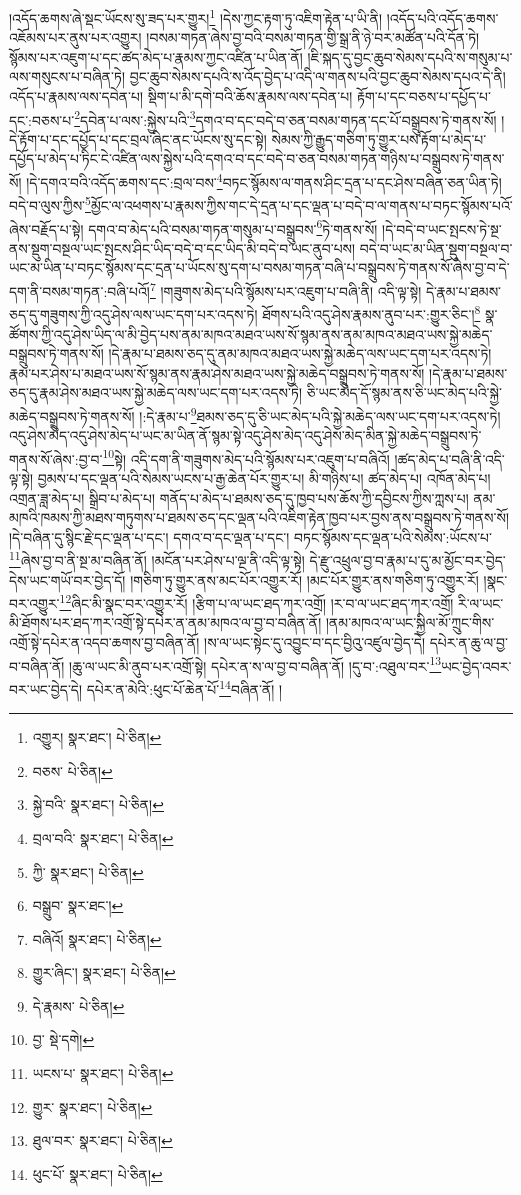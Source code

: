 །འདོད་ཆགས་ཞེ་སྡང་ཡོངས་སུ་ཟད་པར་གྱུར།\footnote{འགྱུར།  སྣར་ཐང་།  པེ་ཅིན། } །དེས་ཀྱང་རྟག་ཏུ་འཇིག་རྟེན་པ་ཡི་ནི། །འདོད་པའི་འདོད་ཆགས་འཇོམས་པར་ནུས་པར་འགྱུར། །བསམ་གཏན་ཞེས་བྱ་བའི་བསམ་གཏན་གྱི་སྒྲ་ནི་ཉེ་བར་མཚོན་པའི་དོན་ཏེ། སྙོམས་པར་འཇུག་པ་དང་ཚད་མེད་པ་རྣམས་ཀྱང་འཛིན་པ་ཡིན་ནོ། །ཇི་སྐད་དུ་བྱང་ཆུབ་སེམས་དཔའི་ས་གསུམ་པ་ལས་གསུངས་པ་བཞིན་ཏེ། བྱང་ཆུབ་སེམས་དཔའི་ས་འོད་བྱེད་པ་འདི་ལ་གནས་པའི་བྱང་ཆུབ་སེམས་དཔའ་དེ་ནི། འདོད་པ་རྣམས་ལས་དབེན་པ། སྡིག་པ་མི་དགེ་བའི་ཆོས་རྣམས་ལས་དབེན་པ། རྟོག་པ་དང་བཅས་པ་དཔྱོད་པ་དང་:བཅས་པ་\footnote{བཅས་  པེ་ཅིན། }དབེན་པ་ལས་:སྐྱེས་པའི་\footnote{སྐྱེ་བའི་  སྣར་ཐང་།  པེ་ཅིན། }དགའ་བ་དང་བདེ་བ་ཅན་བསམ་གཏན་དང་པོ་བསྒྲུབས་ཏེ་གནས་སོ། །དེ་རྟོག་པ་དང་དཔྱོད་པ་དང་བྲལ་ཞིང་ནང་ཡོངས་སུ་དང་སྟེ། སེམས་ཀྱི་རྒྱུད་གཅིག་ཏུ་གྱུར་པས་རྟོག་པ་མེད་པ་དཔྱོད་པ་མེད་པ་ཏིང་ངེ་འཛིན་ལས་སྐྱེས་པའི་དགའ་བ་དང་བདེ་བ་ཅན་བསམ་གཏན་གཉིས་པ་བསྒྲུབས་ཏེ་གནས་སོ། །དེ་དགའ་བའི་འདོད་ཆགས་དང་:བྲལ་བས་\footnote{བྲལ་བའི་  སྣར་ཐང་།  པེ་ཅིན། }བཏང་སྙོམས་ལ་གནས་ཤིང་དྲན་པ་དང་ཤེས་བཞིན་ཅན་ཡིན་ཏེ། བདེ་བ་ལུས་ཀྱིས་\footnote{ཀྱི་  སྣར་ཐང་།  པེ་ཅིན། }མྱོང་ལ་འཕགས་པ་རྣམས་ཀྱིས་གང་དེ་དྲན་པ་དང་ལྡན་པ་བདེ་བ་ལ་གནས་པ་བཏང་སྙོམས་པའོ་ཞེས་བརྗོད་པ་སྟེ། དགའ་བ་མེད་པའི་བསམ་གཏན་གསུམ་པ་བསྒྲུབས་\footnote{བསྒྲུབ་  སྣར་ཐང་། }ཏེ་གནས་སོ། །དེ་བདེ་བ་ཡང་སྤངས་ཏེ་སྔ་ནས་སྡུག་བསྔལ་ཡང་སྤངས་ཤིང་ཡིད་བདེ་བ་དང་ཡིད་མི་བདེ་བ་ཡང་ནུབ་པས། བདེ་བ་ཡང་མ་ཡིན་སྡུག་བསྔལ་བ་ཡང་མ་ཡིན་པ་བཏང་སྙོམས་དང་དྲན་པ་ཡོངས་སུ་དག་པ་བསམ་གཏན་བཞི་པ་བསྒྲུབས་ཏེ་གནས་སོ་ཞེས་བྱ་བ་དེ་དག་ནི་བསམ་གཏན་:བཞི་པའོ།\footnote{བཞིའོ།  སྣར་ཐང་།  པེ་ཅིན། } །གཟུགས་མེད་པའི་སྙོམས་པར་འཇུག་པ་བཞི་ནི། འདི་ལྟ་སྟེ། དེ་རྣམ་པ་ཐམས་ཅད་དུ་གཟུགས་ཀྱི་འདུ་ཤེས་ལས་ཡང་དག་པར་འདས་ཏེ། ཐོགས་པའི་འདུ་ཤེས་རྣམས་ནུབ་པར་:གྱུར་ཅིང་།\footnote{གྱུར་ཞིང་།  སྣར་ཐང་།  པེ་ཅིན། } སྣ་ཚོགས་ཀྱི་འདུ་ཤེས་ཡིད་ལ་མི་བྱེད་པས་ནམ་མཁའ་མཐའ་ཡས་སོ་སྙམ་ནས་ནམ་མཁའ་མཐའ་ཡས་སྐྱེ་མཆེད་བསྒྲུབས་ཏེ་གནས་སོ། །དེ་རྣམ་པ་ཐམས་ཅད་དུ་ནམ་མཁའ་མཐའ་ཡས་སྐྱེ་མཆེད་ལས་ཡང་དག་པར་འདས་ཏེ། རྣམ་པར་ཤེས་པ་མཐའ་ཡས་སོ་སྙམ་ནས་རྣམ་ཤེས་མཐའ་ཡས་སྐྱེ་མཆེད་བསྒྲུབས་ཏེ་གནས་སོ། །དེ་རྣམ་པ་ཐམས་ཅད་དུ་རྣམ་ཤེས་མཐའ་ཡས་སྐྱེ་མཆེད་ལས་ཡང་དག་པར་འདས་ཏེ། ཅི་ཡང་མེད་དོ་སྙམ་ནས་ཅི་ཡང་མེད་པའི་སྐྱེ་མཆེད་བསྒྲུབས་ཏེ་གནས་སོ། །:དེ་རྣམ་པ་\footnote{དེ་རྣམས་  པེ་ཅིན། }ཐམས་ཅད་དུ་ཅི་ཡང་མེད་པའི་སྐྱེ་མཆེད་ལས་ཡང་དག་པར་འདས་ཏེ། འདུ་ཤེས་མེད་འདུ་ཤེས་མེད་པ་ཡང་མ་ཡིན་ནོ་སྙམ་སྟེ་འདུ་ཤེས་མེད་འདུ་ཤེས་མེད་མིན་སྐྱེ་མཆེད་བསྒྲུབས་ཏེ་གནས་སོ་ཞེས་:བྱ་བ་\footnote{བྱ་  སྡེ་དགེ། }སྟེ། འདི་དག་ནི་གཟུགས་མེད་པའི་སྙོམས་པར་འཇུག་པ་བཞིའོ། །ཚད་མེད་པ་བཞི་ནི་འདི་ལྟ་སྟེ། བྱམས་པ་དང་ལྡན་པའི་སེམས་ཡངས་པ་རྒྱ་ཆེན་པོར་གྱུར་པ། མི་གཉིས་པ། ཚད་མེད་པ། འཁོན་མེད་པ། འགྲན་ཟླ་མེད་པ། སྒྲིབ་པ་མེད་པ། གནོད་པ་མེད་པ་ཐམས་ཅད་དུ་ཁྱབ་པས་ཆོས་ཀྱི་དབྱིངས་ཀྱིས་ཀླས་པ། ནམ་མཁའི་ཁམས་ཀྱི་མཐས་གཏུགས་པ་ཐམས་ཅད་དང་ལྡན་པའི་འཇིག་རྟེན་ཁྱབ་པར་བྱས་ནས་བསྒྲུབས་ཏེ་གནས་སོ། །དེ་བཞིན་དུ་སྙིང་རྗེ་དང་ལྡན་པ་དང་། དགའ་བ་དང་ལྡན་པ་དང་། བཏང་སྙོམས་དང་ལྡན་པའི་སེམས་:ཡོངས་པ་\footnote{ཡངས་པ་  སྣར་ཐང་།  པེ་ཅིན། }ཞེས་བྱ་བ་ནི་སྔ་མ་བཞིན་ནོ། །མངོན་པར་ཤེས་པ་ལྔ་ནི་འདི་ལྟ་སྟེ། དེ་རྫུ་འཕྲུལ་བྱ་བ་རྣམ་པ་དུ་མ་མྱོང་བར་བྱེད་དེས་ཡང་གཡོ་བར་བྱེད་དོ། །གཅིག་ཏུ་གྱུར་ནས་མང་པོར་འགྱུར་རོ། །མང་པོར་གྱུར་ནས་གཅིག་ཏུ་འགྱུར་རོ། །སྣང་བར་འགྱུར་\footnote{གྱུར་  སྣར་ཐང་།  པེ་ཅིན། }ཞིང་མི་སྣང་བར་འགྱུར་རོ། །རྩིག་པ་ལ་ཡང་ཐད་ཀར་འགྲོ། །ར་བ་ལ་ཡང་ཐད་ཀར་འགྲོ། རི་ལ་ཡང་མི་ཐོགས་པར་ཐད་ཀར་འགྲོ་སྟེ་དཔེར་ན་ནམ་མཁའ་ལ་བྱ་བ་བཞིན་ནོ། །ནམ་མཁའ་ལ་ཡང་སྐྱིལ་མོ་ཀྲུང་གིས་འགྲོ་སྟེ་དཔེར་ན་འདབ་ཆགས་བྱ་བཞིན་ནོ། །ས་ལ་ཡང་སྟེང་དུ་འབྱུང་བ་དང་བྱིའུ་འཛུལ་བྱེད་དེ། དཔེར་ན་ཆུ་ལ་བྱ་བ་བཞིན་ནོ། །ཆུ་ལ་ཡང་མི་ནུབ་པར་འགྲོ་སྟེ། དཔེར་ན་ས་ལ་བྱ་བ་བཞིན་ནོ། །དུ་བ་:འཐུལ་བར་\footnote{ཐུལ་བར་  སྣར་ཐང་།  པེ་ཅིན། }ཡང་བྱེད་འབར་བར་ཡང་བྱེད་དེ། དཔེར་ན་མེའི་:ཕུང་པོ་ཆེན་པོ་\footnote{ཕུང་པོ་  སྣར་ཐང་།  པེ་ཅིན། }བཞིན་ནོ། །
